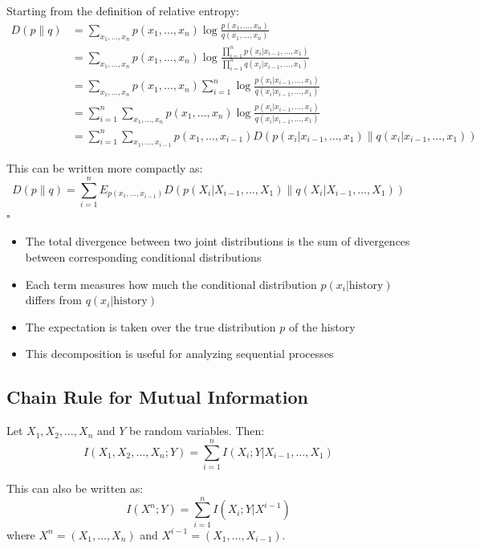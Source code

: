 \documentclass[11pt,a4paper]{book}
\newenvironment{formulabox}[1][Formula]{
    \begin{tcolorbox}[
        enhanced,
        breakable,
        colback=softcoral!10,
        colframe=softcoral!200,
        title=#1,
        fonttitle=\bfseries,
        coltitle=white,
        sharp corners,
        boxrule=1pt,
        left=8pt,
        right=8pt,
        top=6pt,
        bottom=6pt
    ]
}{
    \end{tcolorbox}
}
\newenvironment{infobox}[1][For more understanding]{
    \begin{tcolorbox}[
        enhanced,
        breakable,
        colback=mintgreen!10,
        colframe=mintgreen!200,
        title=#1,
        fonttitle=\bfseries,
        sharp corners,
        boxrule=0.8pt,
        left=8pt,
        right=8pt,
        top=6pt,
        bottom=6pt
    ]
}{
    \end{tcolorbox}
}
\newenvironment{derivationbox}[1][Derivation]{
    \begin{tcolorbox}[
        enhanced,
        breakable,
        colback=softpeach!10,
        colframe=softpeach!200,
        title=#1,
        fonttitle=\bfseries,
        sharp corners,
        boxrule=0.8pt,
        left=10pt,
        right=10pt,
        top=8pt,
        bottom=8pt
    ]
}{
    \end{tcolorbox}
}
\begin{document}
\begin{derivationbox}[Proof of Chain Rule for Relative Entropy]
    Starting from the definition of relative entropy:
    \begin{align*}
    D(p \| q) &= \sum_{x_1, \ldots, x_n} p(x_1, \ldots, x_n) \log \frac{p(x_1, \ldots, x_n)}{q(x_1, \ldots, x_n)} \\
    &= \sum_{x_1, \ldots, x_n} p(x_1, \ldots, x_n) \log \frac{\prod_{i=1}^{n} p(x_i|x_{i-1}, \ldots, x_1)}{\prod_{i=1}^{n} q(x_i|x_{i-1}, \ldots, x_1)} \\
    &= \sum_{x_1, \ldots, x_n} p(x_1, \ldots, x_n) \sum_{i=1}^{n} \log \frac{p(x_i|x_{i-1}, \ldots, x_1)}{q(x_i|x_{i-1}, \ldots, x_1)} \\
    &= \sum_{i=1}^{n} \sum_{x_1, \ldots, x_n} p(x_1, \ldots, x_n) \log \frac{p(x_i|x_{i-1}, \ldots, x_1)}{q(x_i|x_{i-1}, \ldots, x_1)} \\
    &= \sum_{i=1}^{n} \sum_{x_1, \ldots, x_{i-1}} p(x_1, \ldots, x_{i-1}) D(p(x_i|x_{i-1}, \ldots, x_1) \| q(x_i|x_{i-1}, \ldots, x_1))
    \end{align*}
    
    This can be written more compactly as:
    \[
    D(p \| q) = \sum_{i=1}^{n} E_{p(x_1, \ldots, x_{i-1})} D(p(X_i|X_{i-1}, \ldots, X_1) \| q(X_i|X_{i-1}, \ldots, X_1))
    \]
    \(\square\)
\end{derivationbox}

\begin{infobox}[Interpretation]
    \begin{itemize}
        \item The total divergence between two joint distributions is the sum of divergences between corresponding conditional distributions
        \item Each term measures how much the conditional distribution \(p(x_i | \text{history})\) differs from \(q(x_i | \text{history})\)
        \item The expectation is taken over the true distribution \(p\) of the history
        \item This decomposition is useful for analyzing sequential processes
    \end{itemize}
\end{infobox}

\subsection{Chain Rule for Mutual Information}

\begin{formulabox}[Chain Rule for Mutual Information]
    Let \(X_1, X_2, \ldots, X_n\) and \(Y\) be random variables. Then:
    \[
    I(X_1, X_2, \ldots, X_n; Y) = \sum_{i=1}^{n} I(X_i; Y | X_{i-1}, \ldots, X_1)
    \]
    
    This can also be written as:
    \[
    I(X^n; Y) = \sum_{i=1}^{n} I(X_i; Y | X^{i-1})
    \]
    where \(X^n = (X_1, \ldots, X_n)\) and \(X^{i-1} = (X_1, \ldots, X_{i-1})\).
\end{formulabox}
\end{document}
